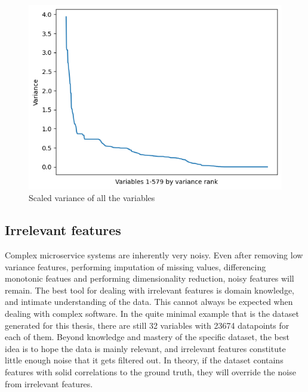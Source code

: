 \begin{figure}[ht]
    \centering
    \includegraphics[width=\columnwidth]{Figures/Graphs/Total_variance}
    \caption{Scaled variance of all the variables}
    \label{variance}
\end{figure}

\subsection*{Irrelevant features}
Complex microservice systems are inherently very noisy.
Even after removing low variance features, performing imputation of missing values, differencing monotonic featues and performing dimensionality reduction, noisy features will remain.
The best tool for dealing with irrelevant features is domain knowledge, and intimate understanding of the data. This cannot always be expected when dealing with complex software. In the quite minimal example that is the dataset generated for this thesis, there are still 32 variables with 23674 datapoints for each of them.
Beyond knowledge and mastery of the specific dataset, the best idea is to hope the data is mainly relevant, and irrelevant features constitute little enough noise that it gets filtered out.
In theory, if the dataset contains features with solid correlations to the ground truth, they will override the noise from irrelevant features.

